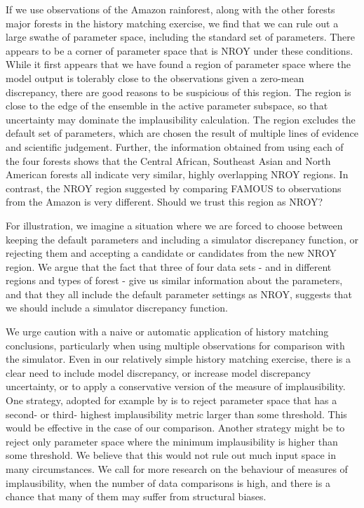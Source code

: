 \documentclass[esd, article]{copernicus} %
\begin{document}
If we use observations of the Amazon rainforest, along with the other forests major forests in the history matching exercise, we find that we can rule out a large swathe of parameter space, including the standard set of parameters. There appears to be a corner of parameter space that is NROY under these conditions. While it first appears that we have found a region of parameter space where the model output is tolerably close to the observations given a zero-mean discrepancy, there are good reasons to be suspicious of this region. The region is close to the edge of the ensemble in the active parameter subspace, so that uncertainty may dominate the implausibility calculation. The region excludes the default set of parameters, which are chosen the result of multiple lines of evidence and scientific judgement. Further, the information obtained from using each of the four forests shows that the Central African, Southeast Asian and North American forests all indicate very similar, highly overlapping NROY regions. In contrast, the NROY region suggested by comparing FAMOUS to observations from the Amazon is very different. Should we trust this region as NROY? 

For illustration, we imagine a situation where we are forced to choose between keeping the default parameters and including a simulator discrepancy function, or rejecting them and accepting a candidate or candidates from the new NROY region. We argue that the fact that three of four data sets - and in different regions and types of forest - give us similar information about the parameters, and that they all include the default parameter settings as NROY, suggests that we should include a simulator discrepancy function.

We urge caution with a naive or automatic application of history matching conclusions, particularly when using multiple observations for comparison with the simulator. Even in our relatively simple history matching exercise, there is a clear need to include model discrepancy, or increase model discrepancy uncertainty, or to apply a conservative version of the measure of implausibility. One strategy, adopted for example by \cite{vernon2014observable} is to reject parameter space that has a second- or third- highest implausibility metric larger than some threshold. This would be effective in the case of our comparison. Another strategy might be to reject only parameter space where the minimum implausibility is higher than some threshold. We believe that this would not rule out much input space in many circumstances. We call for more research on the behaviour of measures of implausibility, when the number of data comparisons is high, and there is a chance that many of them may suffer from structural biases. 
\end{document}
